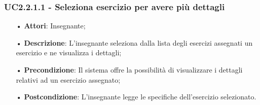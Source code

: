 \subsubsection{UC2.2.1.1 - Seleziona esercizio per avere più dettagli}
\begin{itemize}
	\item[•] \textbf{Attori}: Insegnante;
	\item[•] \textbf{Descrizione}:  L’insegnante seleziona dalla lista degli esercizi assegnati un esercizio e ne visualizza i dettagli;
	\item[•] \textbf{Precondizione}: Il sistema offre la possibilità di visualizzare i dettagli relativi ad un esercizio assegnato;
	\item[•] \textbf{Postcondizione}: L’insegnante legge le specifiche dell’esercizio selezionato.
\end{itemize}

